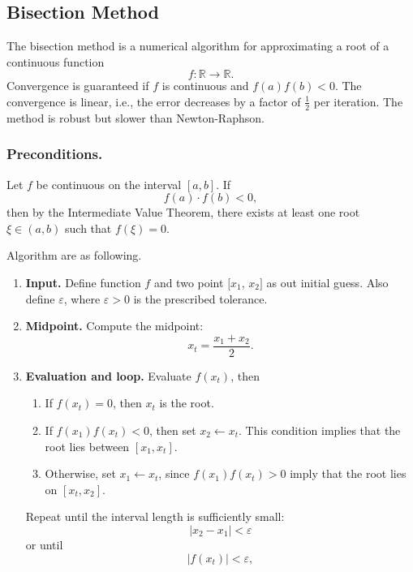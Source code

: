 \documentclass[../../../main.tex]{subfiles}
\begin{document}
\subsection{Bisection Method}

The bisection method is a numerical algorithm for approximating a root of a continuous function
\[
    f : \mathbb{R} \to \mathbb{R}.
\]
Convergence is guaranteed if $f$ is continuous and $f(a)f(b)<0$.
The convergence is linear, i.e., the error decreases by a factor of $\tfrac{1}{2}$ per iteration.
The method is robust but slower than Newton-Raphson.

\subsubsection{Preconditions.}
Let $f$ be continuous on the interval $[a,b]$.
If
\[
    f(a) \cdot f(b) < 0,
\]
then by the Intermediate Value Theorem, there exists at least one root $\xi \in (a,b)$ such that $f(\xi) = 0$.

Algorithm are as following.
\begin{enumerate}
    \item \textbf{Input.} Define function $f$ and two point $[x_1$, $x_2]$ as out initial guess. Also define $\varepsilon$, where $\varepsilon > 0$ is the prescribed tolerance.
    \item \textbf{Midpoint.} Compute the midpoint:
          \begin{equation*}
              x_t= \frac{x_1+x_2}{2}.
          \end{equation*}
    \item \textbf{Evaluation and loop.} Evaluate $f(x_t)$, then
          \begin{enumerate}
              \item If $f(x_t) = 0$, then $x_t$ is the root.
              \item If $f(x_1) f(x_t) < 0$, then set $x_2 \leftarrow x_t$. This condition implies that the root lies between $[x_1,x_t]$.
              \item Otherwise, set $x_1 \leftarrow x_t$, since $f(x_1)f(x_t)>0$ imply that the root lies on $[x_t,x_2]$.
          \end{enumerate}
          Repeat until the interval length is sufficiently small:
          \begin{equation*}
              |x_2 - x_1| < \varepsilon
          \end{equation*}
          or until
          \begin{equation*}
              |f(x_t)| < \varepsilon,
          \end{equation*}
\end{enumerate}
\end{document}
